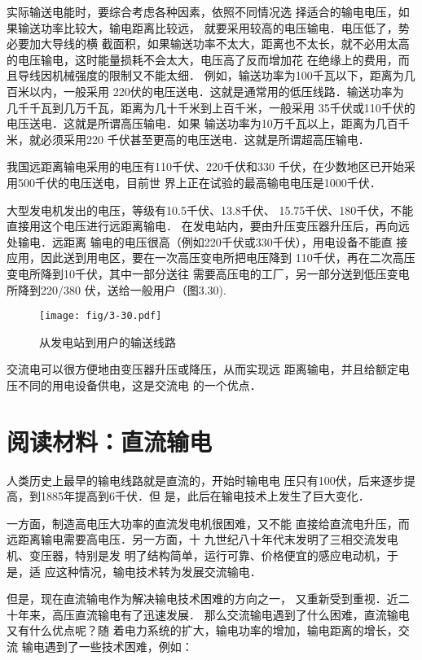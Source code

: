 实际输送电能时，要综合考虑各种因素，依照不同情况选
择适合的输电电压，如果输送功率比较大，输电距离比较远，
就要采用较高的电压输电．电压低了，势必要加大导线的横
截面积，如果输送功率不太大，距离也不太长，就不必用太高
的电压输电，这时能量损耗不会太大，电压高了反而增加花
在绝缘上的费用，而且导线因机械强度的限制又不能太细．
例如，输送功率为100千瓦以下，距离为几百米以内，一般采用
220伏的电压送电．这就是通常用的低压线路．输送功率为
几千千瓦到几万千瓦，距离为几十千米到上百千米，一般采用
35千伏或110千伏的电压送电．这就是所谓高压输电．如果
输送功率为10万千瓦以上，距离为几百千米，就必须采用220
千伏甚至更高的电压送电．这就是所谓超高压输电．

我国远距离输电采用的电压有110千伏、220千伏和330
千伏，在少数地区已开始采用500千伏的电压送电，目前世
界上正在试验的最高输电电压是1000千伏．

大型发电机发出的电压，等级有10.5千伏、13.8千伏、
15.75千伏、180千伏，不能直接用这个电压进行远距离输电．
在发电站内，要由升压变压器升压后，再向远处输电．远距离
输电的电压很高（例如220千伏或330千伏），用电设备不能直
接应用，因此送到用电区，要在一次高压变电所把电压降到
110千伏，再在二次高压变电所降到10千伏，其中一部分送往
需要高压电的工厂，另一部分送到低压变电所降到220/380
伏，送给一般用户（图3.30).
\begin{figure}[htp]\centering
    \texttt{[image: fig/3-30.pdf]}
    \caption{从发电站到用户的输送线路}
    \end{figure}

交流电可以很方便地由变压器升压或降压，从而实现远
距离输电，并且给额定电压不同的用电设备供电，这是交流电
的一个优点．

\section*{阅读材料：直流输电}
人类历史上最早的输电线路就是直流的，开始时输电电
压只有100伏，后来逐步提高，到1885年提高到6千伏．但
是，此后在输电技术上发生了巨大变化．

一方面，制造高电压大功率的直流发电机很困难，又不能
直接给直流电升压，而远距离输电需要高电压．另一方面，十
九世纪八十年代末发明了三相交流发电机、变压器，特别是发
明了结构简单，运行可靠、价格便宜的感应电动机，于是，适
应这种情况，输电技术转为发展交流输电．

但是，现在直流输电作为解决输电技术困难的方向之一，
又重新受到重视．近二十年来，高压直流输电有了迅速发展．
那么交流输电遇到了什么困难，直流输电又有什么优点呢？随
着电力系统的扩大，输电功率的增加，输电距离的增长，交流
输电遇到了一些技术困难，例如：

